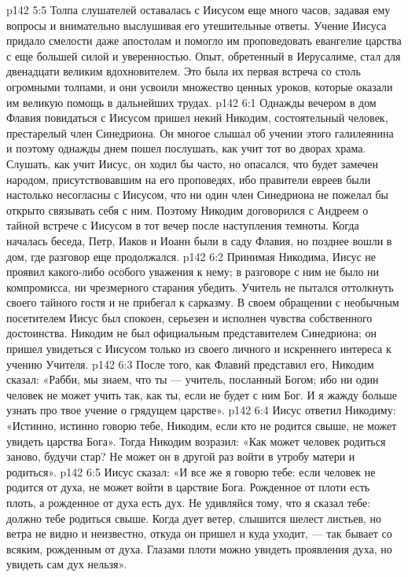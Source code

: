 \vs p142 5:5 \pc Толпа слушателей оставалась с Иисусом еще много часов, задавая ему вопросы и внимательно выслушивая его утешительные ответы. Учение Иисуса придало смелости даже апостолам и помогло им проповедовать евангелие царства с еще большей силой и уверенностью. Опыт, обретенный в Иерусалиме, стал для двенадцати великим вдохновителем. Это была их первая встреча со столь огромными толпами, и они усвоили множество ценных уроков, которые оказали им великую помощь в дальнейших трудах.
\vs p142 6:1 Однажды вечером в дом Флавия повидаться с Иисусом пришел некий Никодим, состоятельный человек, престарелый член Синедриона. Он многое слышал об учении этого галилеянина и поэтому однажды днем пошел послушать, как учит тот во дворах храма. Слушать, как учит Иисус, он ходил бы часто, но опасался, что будет замечен народом, присутствовавшим на его проповедях, ибо правители евреев были настолько несогласны с Иисусом, что ни один член Синедриона не пожелал бы открыто связывать себя с ним. Поэтому Никодим договорился с Андреем о тайной встрече с Иисусом в тот вечер после наступления темноты. Когда началась беседа, Петр, Иаков и Иоанн были в саду Флавия, но позднее вошли в дом, где разговор еще продолжался.
\vs p142 6:2 Принимая Никодима, Иисус не проявил какого\hyp{}либо особого уважения к нему; в разговоре с ним не было ни компромисса, ни чрезмерного старания убедить. Учитель не пытался оттолкнуть своего тайного гостя и не прибегал к сарказму. В своем обращении с необычным посетителем Иисус был спокоен, серьезен и исполнен чувства собственного достоинства. Никодим не был официальным представителем Синедриона; он пришел увидеться с Иисусом только из своего личного и искреннего интереса к учению Учителя.
\vs p142 6:3 После того, как Флавий представил его, Никодим сказал: «Рабби, мы знаем, что ты --- учитель, посланный Богом; ибо ни один человек не может учить так, как ты, если не будет с ним Бог. И я жажду больше узнать про твое учение о грядущем царстве».
\vs p142 6:4 Иисус ответил Никодиму: «Истинно, истинно говорю тебе, Никодим, если кто не родится свыше, не может увидеть царства Бога». Тогда Никодим возразил: «Как может человек родиться заново, будучи стар? Не может он в другой раз войти в утробу матери и родиться».
\vs p142 6:5 Иисус сказал: «И все же я говорю тебе: если человек не родится от духа, не может войти в царствие Бога. Рожденное от плоти есть плоть, а рожденное от духа есть дух. Не удивляйся тому, что я сказал тебе: должно тебе родиться свыше. Когда дует ветер, слышится шелест листьев, но ветра не видно и неизвестно, откуда он пришел и куда уходит, --- так бывает со всяким, рожденным от духа. Глазами плоти можно увидеть проявления духа, но увидеть сам дух нельзя».

